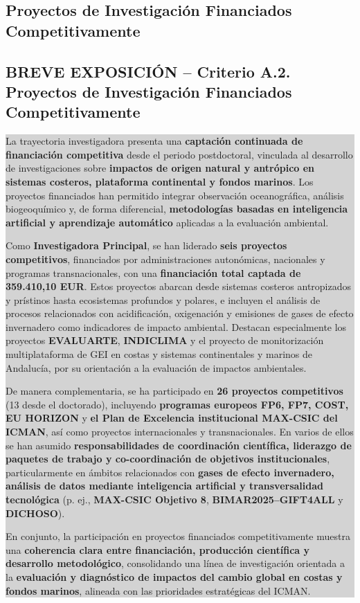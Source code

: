 \documentclass[11pt,a4paper]{article}
\newcommand{\breveexposicion}[2]{
    \subsection*{\color{darkgray}\textbf{BREVE EXPOSICIÓN -- #1}}
    \vspace{0.3em}
    \noindent\colorbox{lightgray}{%
        \begin{minipage}{0.97\textwidth}
        \vspace{0.5em}
        \color{darkgray}
        #2
        \vspace{0.5em}
        \end{minipage}
    }
    \vspace{1em}
}
\begin{document}
\newpage

\subsection{Proyectos de Investigación Financiados Competitivamente}

\breveexposicion{Criterio A.2. Proyectos de Investigación Financiados Competitivamente}{
La trayectoria investigadora presenta una \textbf{captación continuada de financiación competitiva} desde el periodo postdoctoral, vinculada al desarrollo de investigaciones sobre \textbf{impactos de origen natural y antrópico en sistemas costeros, plataforma continental y fondos marinos}. Los proyectos financiados han permitido integrar observación oceanográfica, análisis biogeoquímico y, de forma diferencial, \textbf{metodologías basadas en inteligencia artificial y aprendizaje automático} aplicadas a la evaluación ambiental.

Como \textbf{Investigadora Principal}, se han liderado \textbf{seis proyectos competitivos}, financiados por administraciones autonómicas, nacionales y programas transnacionales, con una \textbf{financiación total captada de 359.410,10 EUR}. Estos proyectos abarcan desde sistemas costeros antropizados y prístinos hasta ecosistemas profundos y polares, e incluyen el análisis de procesos relacionados con acidificación, oxigenación y emisiones de gases de efecto invernadero como indicadores de impacto ambiental. Destacan especialmente los proyectos \textbf{EVALUARTE}, \textbf{INDICLIMA} y el proyecto de monitorización multiplataforma de GEI en costas y sistemas continentales y marinos de Andalucía, por su orientación a la evaluación de impactos ambientales.

De manera complementaria, se ha participado en \textbf{26 proyectos competitivos} (13 desde el doctorado), incluyendo \textbf{programas europeos FP6, FP7, COST, EU HORIZON} y \textbf{el Plan de Excelencia institucional MAX-CSIC del ICMAN}, así como proyectos internacionales y transnacionales. En varios de ellos se han asumido \textbf{responsabilidades de coordinación científica, liderazgo de paquetes de trabajo y co-coordinación de objetivos institucionales}, particularmente en ámbitos relacionados con \textbf{gases de efecto invernadero, análisis de datos mediante inteligencia artificial y transversalidad tecnológica} (p. ej., \textbf{MAX-CSIC Objetivo 8}, \textbf{BIMAR2025--GIFT4ALL} y \textbf{DICHOSO}).

En conjunto, la participación en proyectos financiados competitivamente muestra una \textbf{coherencia clara entre financiación, producción científica y desarrollo metodológico}, consolidando una línea de investigación orientada a la \textbf{evaluación y diagnóstico de impactos del cambio global en costas y fondos marinos}, alineada con las prioridades estratégicas del ICMAN.
}
\end{document}
